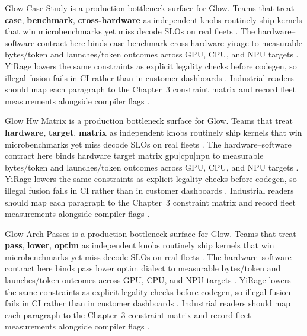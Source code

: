Glow Case Study is a production bottleneck surface for Glow. Teams that treat \textbf{case}, \textbf{benchmark}, \textbf{cross-hardware} as independent knobs routinely ship kernels that win microbenchmarks yet miss decode SLOs on real fleets \citep{semianalysis2024tma,dlbook}. The hardware--software contract here binds case benchmark cross-hardware yirage to measurable bytes/token and launches/token outcomes across GPU, CPU, and NPU targets \citep{amd2024xdna,dao2022flashattention}. YiRage lowers the same constraints as explicit legality checks before codegen, so illegal fusion fails in CI rather than in customer dashboards \citep{amd2024aie,kwon2023vllm}. Industrial readers should map each paragraph to the Chapter~3 constraint matrix and record fleet measurements alongside compiler flags \citep{dlbook,nvidia2024cudagraphs}.

Glow Hw Matrix is a production bottleneck surface for Glow. Teams that treat \textbf{hardware}, \textbf{target}, \textbf{matrix} as independent knobs routinely ship kernels that win microbenchmarks yet miss decode SLOs on real fleets \citep{amd2024xdna,dao2022flashattention}. The hardware--software contract here binds hardware target matrix gpu|cpu|npu to measurable bytes/token and launches/token outcomes across GPU, CPU, and NPU targets \citep{amd2024aie,kwon2023vllm}. YiRage lowers the same constraints as explicit legality checks before codegen, so illegal fusion fails in CI rather than in customer dashboards \citep{dlbook,nvidia2024cudagraphs}. Industrial readers should map each paragraph to the Chapter~3 constraint matrix and record fleet measurements alongside compiler flags \citep{dao2022flashattention,liu2024deepseekv3}.

Glow Arch Passes is a production bottleneck surface for Glow. Teams that treat \textbf{pass}, \textbf{lower}, \textbf{optim} as independent knobs routinely ship kernels that win microbenchmarks yet miss decode SLOs on real fleets \citep{amd2024aie,kwon2023vllm}. The hardware--software contract here binds pass lower optim dialect to measurable bytes/token and launches/token outcomes across GPU, CPU, and NPU targets \citep{dlbook,nvidia2024cudagraphs}. YiRage lowers the same constraints as explicit legality checks before codegen, so illegal fusion fails in CI rather than in customer dashboards \citep{dao2022flashattention,liu2024deepseekv3}. Industrial readers should map each paragraph to the Chapter~3 constraint matrix and record fleet measurements alongside compiler flags \citep{kwon2023vllm,patel2025llminference}.

